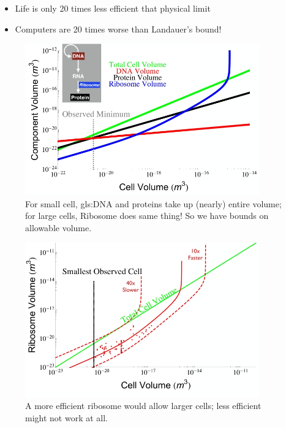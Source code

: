 \documentclass[]{article}
\begin{document}
\begin{itemize}
	\item Life is only 20 times less efficient that physical limit\cite{kempes2017thermodynamic}
	\item Computers are 20 times worse than Landauer's bound!
\end{itemize}

\begin{figure}[H]
	\caption{For small cell, \gls{gls:DNA} and proteins take up (nearly) entire volume; for large cells, Ribosome does same thing! So we have bounds on allowable volume.\cite{kempes2016evolutionary}}\label{fig:RibosomeTradeoffs} 
	\includegraphics[width=0.9\textwidth]{RibosomeTradeoffs}
\end{figure}

\begin{figure}[H]
	\caption{A more efficient ribosome would allow larger cells; less efficient might not work at all.}\label{fig:RibosomeTradeoffsEarly} 
	\includegraphics[width=0.9\textwidth]{RibosomeTradeoffsEarly}
\end{figure}
\end{document}
